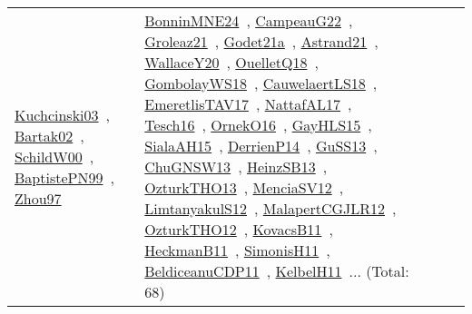 {\begin{longtable}{lp{3cm}>{\raggedright\arraybackslash}p{6cm}>{\raggedright\arraybackslash}p{6cm}>{\raggedright\arraybackslash}p{8cm}}
\href{../works/Kuchcinski03.pdf}{Kuchcinski03}~\cite{Kuchcinski03}, \href{../works/Bartak02.pdf}{Bartak02}~\cite{Bartak02}, \href{../works/SchildW00.pdf}{SchildW00}~\cite{SchildW00}, \href{../works/BaptistePN99.pdf}{BaptistePN99}~\cite{BaptistePN99}, \href{../works/Zhou97.pdf}{Zhou97}~\cite{Zhou97} & \href{../works/BonninMNE24.pdf}{BonninMNE24}~\cite{BonninMNE24}, \href{../works/CampeauG22.pdf}{CampeauG22}~\cite{CampeauG22}, \href{../works/Groleaz21.pdf}{Groleaz21}~\cite{Groleaz21}, \href{../works/Godet21a.pdf}{Godet21a}~\cite{Godet21a}, \href{../works/Astrand21.pdf}{Astrand21}~\cite{Astrand21}, \href{../works/WallaceY20.pdf}{WallaceY20}~\cite{WallaceY20}, \href{../works/OuelletQ18.pdf}{OuelletQ18}~\cite{OuelletQ18}, \href{../works/GombolayWS18.pdf}{GombolayWS18}~\cite{GombolayWS18}, \href{../works/CauwelaertLS18.pdf}{CauwelaertLS18}~\cite{CauwelaertLS18}, \href{../works/EmeretlisTAV17.pdf}{EmeretlisTAV17}~\cite{EmeretlisTAV17}, \href{../works/NattafAL17.pdf}{NattafAL17}~\cite{NattafAL17}, \href{../works/Tesch16.pdf}{Tesch16}~\cite{Tesch16}, \href{../works/OrnekO16.pdf}{OrnekO16}~\cite{OrnekO16}, \href{../works/GayHLS15.pdf}{GayHLS15}~\cite{GayHLS15}, \href{../works/SialaAH15.pdf}{SialaAH15}~\cite{SialaAH15}, \href{../works/DerrienP14.pdf}{DerrienP14}~\cite{DerrienP14}, \href{../works/GuSS13.pdf}{GuSS13}~\cite{GuSS13}, \href{../works/ChuGNSW13.pdf}{ChuGNSW13}~\cite{ChuGNSW13}, \href{../works/HeinzSB13.pdf}{HeinzSB13}~\cite{HeinzSB13}, \href{../works/OzturkTHO13.pdf}{OzturkTHO13}~\cite{OzturkTHO13}, \href{../works/MenciaSV12.pdf}{MenciaSV12}~\cite{MenciaSV12}, \href{../works/LimtanyakulS12.pdf}{LimtanyakulS12}~\cite{LimtanyakulS12}, \href{../works/MalapertCGJLR12.pdf}{MalapertCGJLR12}~\cite{MalapertCGJLR12}, \href{../works/OzturkTHO12.pdf}{OzturkTHO12}~\cite{OzturkTHO12}, \href{../works/KovacsB11.pdf}{KovacsB11}~\cite{KovacsB11}, \href{../works/HeckmanB11.pdf}{HeckmanB11}~\cite{HeckmanB11}, \href{../works/SimonisH11.pdf}{SimonisH11}~\cite{SimonisH11}, \href{../works/BeldiceanuCDP11.pdf}{BeldiceanuCDP11}~\cite{BeldiceanuCDP11}, \href{../works/KelbelH11.pdf}{KelbelH11}~\cite{KelbelH11}... (Total: 68)\\

\end{longtable}}
